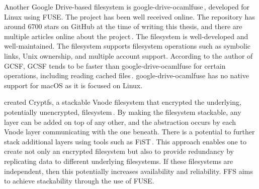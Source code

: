 Another Google \mbox{Drive-based} filesystem is \mbox{google-drive-ocamlfuse}\,\cite{stradaGoogledriveocamlfuse2022}, developed for Linux using \gls{FUSE}. The project has been well received online. The repository has around \num{6700} stars on GitHub at the time of writing this thesis, and there are multiple articles online about the project\,\cite{guoanInstallGoogleDrive2021,sneddonMountYourGoogle2017,aminUseGoogleDrive2021}. The filesystem is well-developed and well-maintained. The filesystem supports filesystem operations such as symbolic links, Unix ownership, and multiple account support. According to the author of \gls{GCSF}, \gls{GCSF} tends to be faster than \mbox{google-drive-ocamlfuse} for certain operations, including reading cached files\,\cite{sergiudanShortGCSFTends2018,puscassergiudanShowHNGoogle2018}. \mbox{google-drive-ocamlfuse} has no native support for macOS as it is focused on Linux. 

\citeauthor{zadokCryptfsStackableVnode1998a} created Cryptfs, a stackable Vnode filesystem that encrypted the underlying, potentially unencrypted, filesystem\,\cite{zadokCryptfsStackableVnode1998a}. By making the filesystem stackable, any layer can be added on top of any other, and the abstraction occurs by each Vnode layer communicating with the one beneath. There is a potential to further stack additional layers using tools such as FiST\,\cite{zadokFiSTStackableFile}. This approach enables one to create not only an encrypted filesystem but also to provide redundancy by replicating data to different underlying filesystems. If these filesystems are independent, then this potentially increases availability and reliability. \gls{FFS} aims to achieve stackability through the use of \gls{FUSE}. 

%
